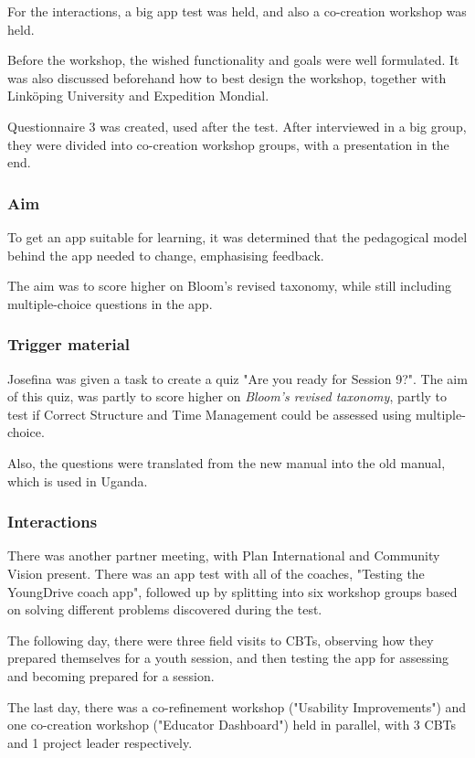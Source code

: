 For the interactions, a big app test was held, and also a co-creation workshop was held.

Before the workshop, the wished functionality and goals were well formulated. It was also discussed beforehand how to best design the workshop, together with Linköping University and Expedition Mondial.

Questionnaire 3 was created, used after the test. After interviewed in a big group, they were divided into co-creation workshop groups, with a presentation in the end.

\subsubsection{Aim}

To get an app suitable for learning, it was determined that the pedagogical model behind the app needed to change, emphasising feedback.

The aim was to score higher on Bloom's revised taxonomy, while still including multiple-choice questions in the app.

\subsubsection*{Trigger material}

Josefina was given a task to create a quiz "Are you ready for Session 9?". The aim of this quiz, was partly to score higher on \textit{Bloom's revised taxonomy}, partly to test if Correct Structure and Time Management could be assessed using multiple-choice.

Also, the questions were translated from the new manual into the old manual, which is used in Uganda.

\subsubsection*{Interactions}

There was another partner meeting, with Plan International and Community Vision present. There was an app test with all of the coaches, "Testing the YoungDrive coach app", followed up by splitting into six workshop groups based on solving different problems discovered during the test.

The following day, there were three field visits to CBTs, observing how they prepared themselves for a youth session, and then testing the app for assessing and becoming prepared for a session.

The last day, there was a co-refinement workshop ("Usability Improvements") and one co-creation workshop ("Educator Dashboard") held in parallel, with 3 CBTs and 1 project leader respectively.

